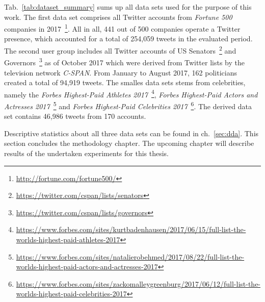 Tab.~\ref{tab:dataset_summary} sums up all data sets used for the purpose of
this work.
The first data set comprises all Twitter accounts from \textit{Fortune 500}
companies in 2017~\footnote{\url{http://fortune.com/fortune500/}}.
All in all, 441 out of 500 companies operate a Twitter presence, which accounted
for a total of 254,059 tweets in the evaluated period.
The second user group includes all Twitter accounts of US Senators~\footnote{\url{https://twitter.com/cspan/lists/senators}} and Governors~\footnote{\url{https://twitter.com/cspan/lists/governors}}
as of October 2017 which were derived from Twitter lists by the television
network \textit{C-SPAN}.
From January to August 2017, 162 politicians created a total of 94,919 tweets.
The smalles data sets stems from celebrities, namely the \textit{Forbes Highest-Paid
Athletes 2017}~\footnote{\url{https://www.forbes.com/sites/kurtbadenhausen/2017/06/15/full-list-the-worlds-highest-paid-athletes-2017}}, \textit{Forbes Highest-Paid Actors and Actresses 2017}~\footnote{\url{https://www.forbes.com/sites/natalierobehmed/2017/08/22/full-list-the-worlds-highest-paid-actors-and-actresses-2017}} and
\textit{Forbes Highest-Paid Celebrities 2017}~\footnote{\url{https://www.forbes.com/sites/zackomalleygreenburg/2017/06/12/full-list-the-worlds-highest-paid-celebrities-2017}}.
The derived data set contains 46,986 tweets from 170 accounts.


Descriptive statistics about all three data sets can be found in ch.~\ref{sec:dda}.
This section concludes the methodology chapter.
The upcoming chapter will describe results of the undertaken experiments for
this thesis.
